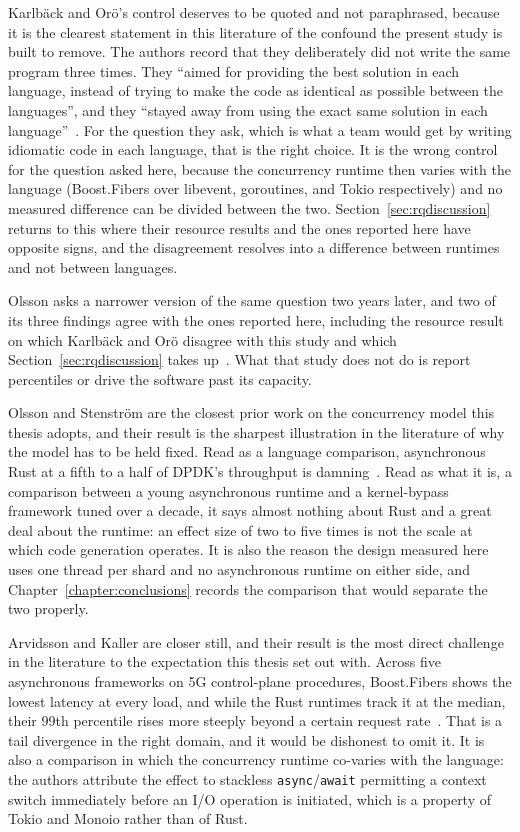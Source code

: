 \documentclass[english,oneside,a4paper,censored,csm,software-track-2020]{HYthesisML}
\begin{document}
Karlb\"ack and Or\"o's control deserves to be quoted and not paraphrased, because it is the
clearest statement in this literature of the confound the present study is built to remove. The
authors record that they deliberately did not write the same program three times. They ``aimed for
providing the best solution in each language, instead of trying to make the code as identical as
possible between the languages'', and they ``stayed away from using the exact same solution in
each language''~\cite{karlback2021ran}. For the question they ask, which is what a team would
get by writing idiomatic code in each language, that is the right choice. It is the wrong
control for the question asked here, because the concurrency runtime then varies with the language
(Boost.Fibers over libevent, goroutines, and Tokio respectively) and no measured difference can be
divided between the two. Section~\ref{sec:rqdiscussion} returns to this where their resource
results and the ones reported here have opposite signs, and the disagreement resolves into a
difference between runtimes and not between languages.

Olsson asks a narrower version of the same question two years later, and two of its three findings
agree with the ones reported here, including the resource result on which Karlb\"ack and Or\"o
disagree with this study and which Section~\ref{sec:rqdiscussion} takes
up~\cite{olsson2023ranmgmt}. What that study does not do is report percentiles or drive the
software past its capacity.

Olsson and Stenstr\"om are the closest prior work on the concurrency model this thesis adopts,
and their result is the sharpest illustration in the literature of why the model has to be held
fixed. Read as a language comparison, asynchronous Rust at a fifth to a half of DPDK's throughput
is damning~\cite{olsson2023asyncpackets}. Read as what it is, a comparison between a young
asynchronous runtime and a kernel-bypass framework tuned over a decade, it says almost nothing
about Rust and a great deal about the runtime: an effect size of two to five times is not the
scale at which code generation operates. It is also the reason the design measured here uses one
thread per shard and no asynchronous runtime on either side, and
Chapter~\ref{chapter:conclusions} records the comparison that would separate the two properly.

Arvidsson and Kaller are closer still, and their result is the most direct challenge in the
literature to the expectation this thesis set out with. Across five asynchronous frameworks on 5G
control-plane procedures, Boost.Fibers shows the lowest latency at every load, and while the Rust
runtimes track it at the median, their 99th percentile rises more steeply beyond a certain request
rate~\cite{arvidsson2025async}. That is a tail divergence in the right domain, and it would be
dishonest to omit it. It is also a comparison in which the concurrency runtime co-varies with the
language: the authors attribute the effect to stackless \texttt{async}/\texttt{await} permitting a
context switch immediately before an I/O operation is initiated, which is a property of Tokio and
Monoio rather than of Rust.
\end{document}
